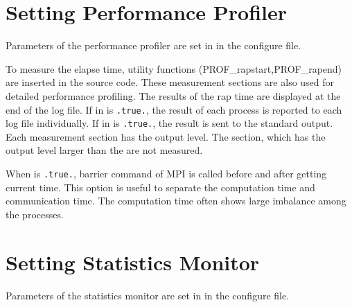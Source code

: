 \section{Setting Performance Profiler} \label{subsec:prof}

Parameters of the performance profiler are set in  in the configure file.


\noindent
To measure the elapse time, utility functions (PROF\_rapstart,PROF\_rapend) are inserted in the source code.
These measurement sections are also used for detailed performance profiling.
%
The results of the rap time are displayed at the end of the log file.
If  in   is \verb|.true.|, the result of each process is reported to each log file individually.
If  in  is \verb|.true.|, the result is sent to the standard output.
%
Each measurement section has the output level. The section, which has the output level larger than the  are not measured.

When  is \verb|.true.|, barrier command of MPI is called before and after getting current time.
This option is useful to separate the computation time and communication time.
The computation time often shows large imbalance among the processes.



\section{Setting Statistics Monitor} \label{subsec:statistics}

Parameters of the statistics monitor are set in  in the configure file.

